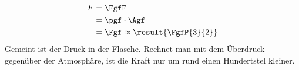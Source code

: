 \begin{align}
 F &= \FgfF \\
   &= \pgf\cdot\Agf \\
   &= \Fgf \approx \result{\FgfP{3}{2}}
\end{align}
Gemeint ist der Druck in der Flasche. Rechnet man mit dem Überdruck gegenüber der Atmosphäre, ist die Kraft nur um rund einen Hundertstel kleiner.
